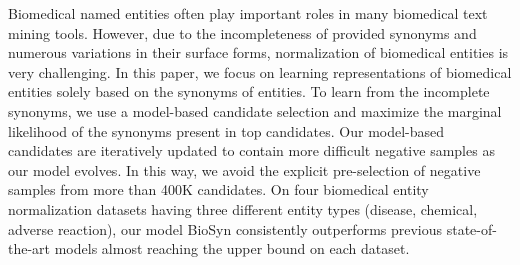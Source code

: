 Biomedical named entities often play important roles in many biomedical text mining tools. However, due to the incompleteness of provided synonyms and numerous variations in their surface forms, normalization of biomedical entities is very challenging. In this paper, we focus on learning representations of biomedical entities solely based on the synonyms of entities. To learn from the incomplete synonyms, we use a model-based candidate selection and maximize the marginal likelihood of the synonyms present in top candidates. Our model-based candidates are iteratively updated to contain more difficult negative samples as our model evolves. In this way, we avoid the explicit pre-selection of negative samples from more than 400K candidates. On four biomedical entity normalization datasets having three different entity types (disease, chemical, adverse reaction), our model BioSyn consistently outperforms previous state-of-the-art models almost reaching the upper bound on each dataset.
